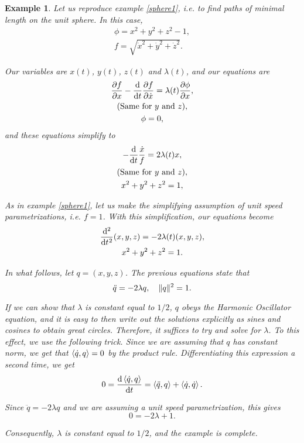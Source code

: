 \documentclass{article}
\theoremstyle{plain}
\theoremstyle{plain}
\newtheorem{example}{Example}
\theoremstyle{nonumberplain}
\theoremstyle{empty}
\DeclarePairedDelimiter\norm{\lVert}{\rVert}
\begin{document}
\begin{example}
Let us reproduce example \ref{sphere1}, i.e. to find paths of minimal length on the unit sphere.  In this case,
\begin{gather*}
\phi = x^2 + y^2 + z^2 - 1,\\
f = \sqrt{\dot x^2 + \dot y^2 + \dot z^2}.
\end{gather*}

Our variables are $x(t)$, $y(t)$, $z(t)$ and $\lambda(t)$, and our equations are
\begin{gather*}
\diffp f x - \diff*{\diffp f {\dot x}}t = \lambda(t) \diffp \phi x,\\
\text{(Same for $y$ and $z$)},\\
\phi = 0,
\end{gather*}
and these equations simplify to
\begin{gather*}
- \diff*{\frac{\dot x}f}t = 2 \lambda(t) x,\\
\text{(Same for $y$ and $z$)},\\
x^2 + y^2 + z^2 = 1,
\end{gather*}

As in example \ref{sphere1}, let us make the simplifying assumption of unit speed parametrizations, i.e. $f = 1$. With this simplification, our equations become
\begin{gather*}
\diff*[2]{(x,y,z)}{t} = -2 \lambda(t) (x,y,z),\\
x^2 + y^2 + z^2 = 1.
\end{gather*}

In what follows, let $q = (x,y,z)$. The previous equations state that
\[\ddot q = - 2 \lambda q, \quad \norm{q}^2 = 1.\]

If we can show that $\lambda$ is constant equal to $1/2$, $q$ obeys the Harmonic Oscillator equation, and it is easy to then write out the solutions explicitly as sines and cosines to obtain great circles. Therefore, it suffices to try and solve for $\lambda$. To this effect, we use the following trick. Since we are assuming that $q$ has constant norm, we get that $\braket{\dot q, q} = 0$ by the product rule. Differentiating this expression a second time, we get
\[0 = \diff{\braket{\dot q, q}}t = \braket{\ddot q, q} + \braket{\dot q, \dot q}.\]

Since $\ddot q = - 2 \lambda q$ and we are assuming a unit speed parametrization, this gives
\[0 = - 2 \lambda + 1.\]

Consequently, $\lambda$ is constant equal to $1/2$, and the example is complete.
\end{example}
\end{document}
